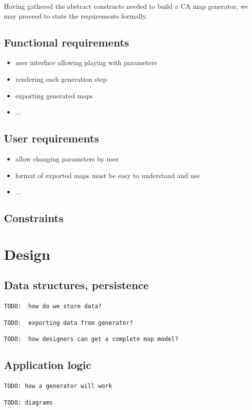 \documentclass[12pt]{report}
\newcommand{\todo}[1]{}
\renewcommand{\todo}[1]{{\color{red} \par \noindent \footnotesize \texttt{TODO: {#1} }}}
\begin{document}
Having gathered the abstract constructs needed to build a CA map generator, we may proceed to state the requirements formally.

\subsection{Functional requirements}

\begin{itemize}
	\item user interface allowing playing with parameters
	\item rendering each generation step
	\item exporting generated maps
	\item ...
\end{itemize}

\subsection{User requirements}

\begin{itemize}
	\item allow changing parameters by user
	\item format of exported maps must be easy to understand and use
	\item ...
\end{itemize}

\subsection{Constraints}


\section{Design}
\subsection{Data structures, persistence}
 
\todo{ how do we store data?}
\todo{ exporting data from generator? }
\todo{ how designers can get a complete map model? } 
 
\subsection{Application logic} 

\todo{how a generator will work}
\todo{diagrams}
\end{document}
